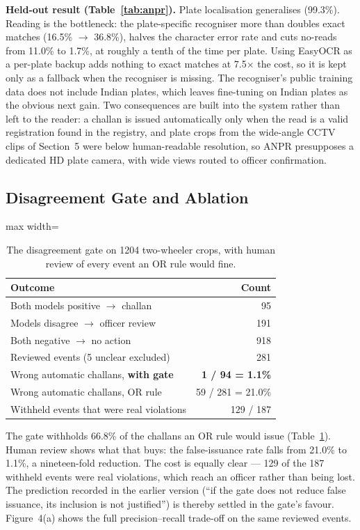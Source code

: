 \documentclass[10pt,a4paper,twocolumn]{article}
\begin{document}
\textbf{Held-out result (Table~\ref{tab:anpr}).} Plate localisation generalises (99.3\%). Reading is the bottleneck: the
plate-specific recogniser more than doubles exact matches (16.5\% $\rightarrow$ 36.8\%), halves the character error
rate and cuts no-reads from 11.0\% to 1.7\%, at roughly a tenth of the time per plate. Using EasyOCR as a per-plate
backup adds nothing to exact matches at 7.5$\times$ the cost, so it is kept only as a fallback when the recogniser is
missing. The recogniser's public training data does not include Indian plates, which leaves fine-tuning on Indian
plates as the obvious next gain. Two consequences are built into the system rather than left to the reader: a challan is
issued automatically only when the read is a valid registration found in the registry, and plate crops from the
wide-angle CCTV clips of Section~5 were below human-readable resolution, so ANPR presupposes a dedicated HD plate
camera, with wide views routed to officer confirmation.

\subsection{Disagreement Gate and Ablation}
\begin{table}[t]
\centering\scriptsize
\caption{The disagreement gate on 1204 two-wheeler crops, with human review of every event an OR rule would fine.}\label{tab:gate}
\begin{adjustbox}{max width=\columnwidth}
\begin{tabular}{@{}lr@{}}
\toprule
Outcome & Count\\
\midrule
Both models positive $\rightarrow$ challan & 95\\
Models disagree $\rightarrow$ officer review & 191\\
Both negative $\rightarrow$ no action & 918\\
\midrule
Reviewed events (5 unclear excluded) & 281\\
Wrong automatic challans, \textbf{with gate} & \textbf{1 / 94 = 1.1\%}\\
Wrong automatic challans, OR rule & 59 / 281 = 21.0\%\\
Withheld events that were real violations & 129 / 187\\
\bottomrule
\end{tabular}
\end{adjustbox}
\end{table}

The gate withholds 66.8\% of the challans an OR rule would issue (Table~\ref{tab:gate}). Human review shows what that buys: the
false-issuance rate falls from 21.0\% to 1.1\%, a nineteen-fold reduction. The cost is equally clear --- 129 of the 187
withheld events were real violations, which reach an officer rather than being lost. The prediction recorded in the
earlier version (``if the gate does not reduce false issuance, its inclusion is not justified'') is thereby settled in
the gate's favour. Figure~4(a) shows the full precision--recall trade-off on the same reviewed events.
\end{document}
